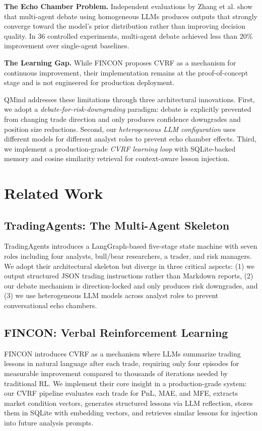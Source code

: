 \documentclass[twocolumn]{article}
\begin{document}
\textbf{The Echo Chamber Problem.} Independent evaluations by Zhang et al.\cite{nguyen2026reliable} show that multi-agent debate using homogeneous LLMs produces outputs that strongly converge toward the model's prior distribution rather than improving decision quality. In 36 controlled experiments, multi-agent debate achieved less than 20\% improvement over single-agent baselines.

\textbf{The Learning Gap.} While FINCON\cite{fincon2024} proposes CVRF as a mechanism for continuous improvement, their implementation remains at the proof-of-concept stage and is not engineered for production deployment.

QMind addresses these limitations through three architectural innovations. First, we adopt a \textit{debate-for-risk-downgrading} paradigm: debate is explicitly prevented from changing trade direction and only produces confidence downgrades and position size reductions. Second, our \textit{heterogeneous LLM configuration} uses different models for different analyst roles to prevent echo chamber effects. Third, we implement a production-grade \textit{CVRF learning loop} with SQLite-backed memory and cosine similarity retrieval for context-aware lesson injection.

\section{Related Work}

\subsection{TradingAgents: The Multi-Agent Skeleton}

TradingAgents\cite{tradingagents2024} introduces a LangGraph-based five-stage state machine with seven roles including four analysts, bull/bear researchers, a trader, and risk managers. We adopt their architectural skeleton but diverge in three critical aspects: (1) we output structured JSON trading instructions rather than Markdown reports, (2) our debate mechanism is direction-locked and only produces risk downgrades, and (3) we use heterogeneous LLM models across analyst roles to prevent conversational echo chambers.

\subsection{FINCON: Verbal Reinforcement Learning}

FINCON\cite{fincon2024} introduces CVRF as a mechanism where LLMs summarize trading lessons in natural language after each trade, requiring only four episodes for measurable improvement compared to thousands of iterations needed by traditional RL. We implement their core insight in a production-grade system: our CVRF pipeline evaluates each trade for PnL, MAE, and MFE, extracts market condition vectors, generates structured lessons via LLM reflection, stores them in SQLite with embedding vectors, and retrieves similar lessons for injection into future analysis prompts.
\end{document}
